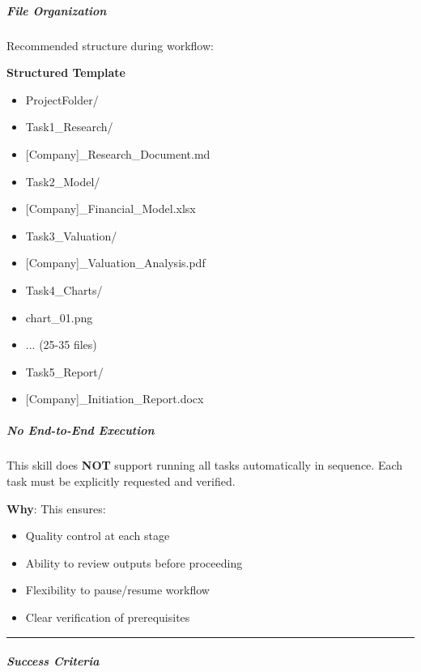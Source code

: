 \documentclass[11pt]{article}
\begin{document}
\subparagraph{File Organization}\mbox{}\par

Recommended structure during workflow:

\textbf{Structured Template}
\begin{itemize}[leftmargin=*,itemsep=2pt,topsep=2pt]
\item {} ProjectFolder/
\item {} Task1\_\allowbreak{}Research/
\item {} [Company]\_\allowbreak{}Research\_\allowbreak{}Document.md
\item {} Task2\_\allowbreak{}Model/
\item {} [Company]\_\allowbreak{}Financial\_\allowbreak{}Model.xlsx
\item {} Task3\_\allowbreak{}Valuation/
\item {} [Company]\_\allowbreak{}Valuation\_\allowbreak{}Analysis.pdf
\item {} Task4\_\allowbreak{}Charts/
\item {} chart\_\allowbreak{}01.png
\item {} ... (25-35 files)
\item {} Task5\_\allowbreak{}Report/
\item {} [Company]\_\allowbreak{}Initiation\_\allowbreak{}Report.docx
\end{itemize}

\subparagraph{No End-to-End Execution}\mbox{}\par

This skill does \textbf{NOT} support running all tasks automatically in sequence. Each task must be explicitly requested and verified.


\textbf{Why}: This ensures:

\begin{itemize}[leftmargin=*,itemsep=2pt,topsep=2pt]
\item {} Quality control at each stage
\item {} Ability to review outputs before proceeding
\item {} Flexibility to pause/resume workflow
\item {} Clear verification of prerequisites
\end{itemize}

\vspace{0.5em}\hrule\vspace{0.5em}

\subparagraph{Success Criteria}\mbox{}\par
\end{document}
